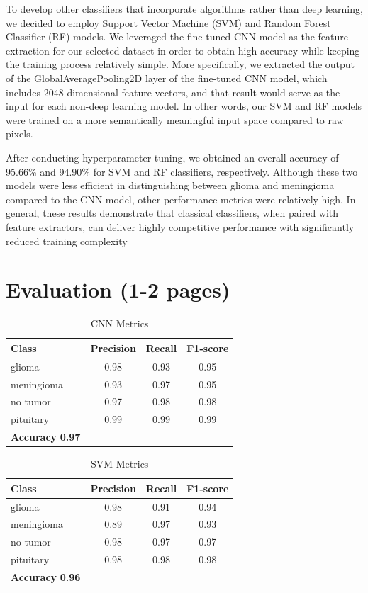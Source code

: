 \documentclass[conference]{IEEEtran}
\begin{document}
To develop other classifiers that incorporate algorithms rather than deep learning, we decided to employ Support Vector Machine (SVM) and Random Forest Classifier (RF) models. We leveraged the fine-tuned CNN model as the feature extraction for our selected dataset in order to obtain high accuracy while keeping the training process relatively simple. More specifically, we extracted the output of the GlobalAveragePooling2D layer of the fine-tuned CNN model, which includes 2048-dimensional feature vectors, and that result would serve as the input for each non-deep learning model. In other words, our SVM and RF models were trained on a more semantically meaningful input space compared to raw pixels. 

After conducting hyperparameter tuning, we obtained an overall accuracy of 95.66\% and 94.90\% for SVM and RF classifiers, respectively. Although these two models were less efficient in distinguishing between glioma and meningioma compared to the CNN model, other performance metrics were relatively high. In general, these results demonstrate that classical classifiers, when paired with feature extractors, can deliver highly competitive performance with significantly reduced training complexity

\section{\large Evaluation (1-2 pages)}

\begin{table}[h!]
\centering
\caption{CNN Metrics}
\begin{tabular}{lccc}
\toprule
\textbf{Class} & \textbf{Precision} & \textbf{Recall} & \textbf{F1-score} \\
\midrule
glioma     & 0.98 & 0.93 & 0.95 \\
meningioma & 0.93 & 0.97 & 0.95 \\
no tumor   & 0.97 & 0.98 & 0.98 \\
pituitary  & 0.99 & 0.99 & 0.99 \\
\midrule
\textbf{Accuracy} \textbf{0.97} \\
\bottomrule
\end{tabular}
\end{table}

\begin{table}[h!]
\centering
\caption{SVM Metrics}
\begin{tabular}{lccc}
\toprule
\textbf{Class} & \textbf{Precision} & \textbf{Recall} & \textbf{F1-score} \\
\midrule
glioma     & 0.98 & 0.91 & 0.94 \\
meningioma & 0.89 & 0.97 & 0.93 \\
no tumor   & 0.98 & 0.97 & 0.97 \\
pituitary  & 0.98 & 0.98 & 0.98 \\
\midrule
\textbf{Accuracy} \textbf{0.96} \\
\bottomrule
\end{tabular}
\end{table}
\end{document}
